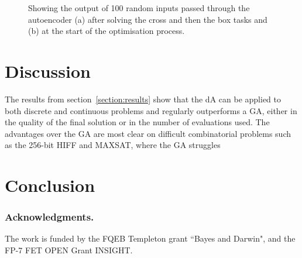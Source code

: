 \documentclass[runningheads,a4paper]{llncs}
\begin{document}
\begin{figure}[!]
{{    \label{fig:subfig2}
    }
}
\caption[Optional caption for list of figures]{Showing the output of 100 random inputs passed through the autoencoder (a) after solving the cross and then the box tasks and (b) at the start of the optimisation process.}
\label{figure:experiment_subplots}
\end{figure}
\section{Discussion}
The results from section~\ref{section:results} show that the dA can be applied to both discrete and continuous problems and regularly outperforms a GA, either in the quality of the final solution or in the number of evaluations used. The advantages over the GA are most clear on difficult combinatorial problems such as the 256-bit HIFF and MAXSAT, where the GA struggles 
\section{Conclusion}

\subsubsection*{Acknowledgments.} The work is funded by the FQEB Templeton grant ``Bayes and Darwin", and the FP-7 FET OPEN Grant INSIGHT.



\end{document}

